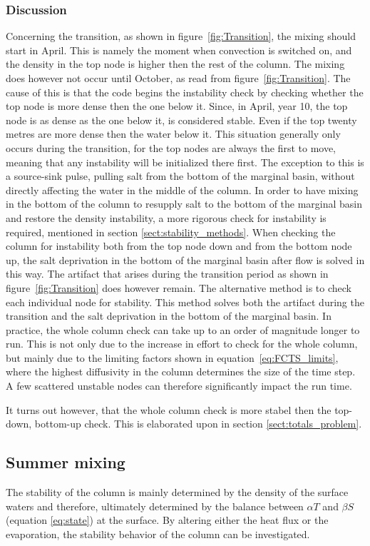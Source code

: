 \documentclass[twocolumn]{article}
\begin{document}
\subsubsection{Discussion}
Concerning the transition, as shown in figure~\ref{fig:Transition}, the mixing should start in April. This is namely the moment when convection is switched on, and the density in the top node is higher then the rest of the column. The mixing does however not occur until October, as read from figure~\ref{fig:Transition}. The cause of this is that the code begins the instability check by checking whether the top node is more dense then the one below it. Since, in April, year 10, the top node is as dense as the one below it, is considered stable. Even if the top twenty metres are more dense then the water below it. This situation generally only occurs during the transition, for the top nodes are always the first to move, meaning that any instability will be initialized there first. The exception to this is a source-sink pulse, pulling salt from the bottom of the marginal basin, without directly affecting the water in the middle of the column. In order to have mixing in the bottom of the column to resupply salt to the bottom of the marginal basin and restore the density instability, a more rigorous check for instability is required, mentioned in section \ref{sect:stability_methods}. When checking the column for instability both from the top node down and from the bottom node up, the salt deprivation in the bottom of the marginal basin after flow is solved in this way. The artifact that arises during the transition period as shown in figure~\ref{fig:Transition} does however remain.
The alternative method is to check each individual node for stability. This method solves both the artifact during the transition and the salt deprivation in the bottom of the marginal basin. In practice, the whole column check can take up to an order of magnitude longer to run. This is not only due to the increase in effort to check for the whole column, but mainly due to the limiting factors shown in equation~\ref{eq:FCTS_limits}, where the highest diffusivity in the column determines the size of the time step. A few scattered unstable nodes can therefore significantly impact the run time. 

It turns out however, that the whole column check is more stabel then the top-down, bottom-up check. This is elaborated upon in section \ref{sect:totals_problem}.

\subsection{Summer mixing}
The stability of the column is mainly determined by the density of the surface waters and therefore, ultimately determined by the balance between $\alpha T$ and $\beta S$ (equation \ref{eq:state}) at the surface. By altering either the heat flux or the evaporation, the stability behavior of the column can be investigated.
\end{document}
